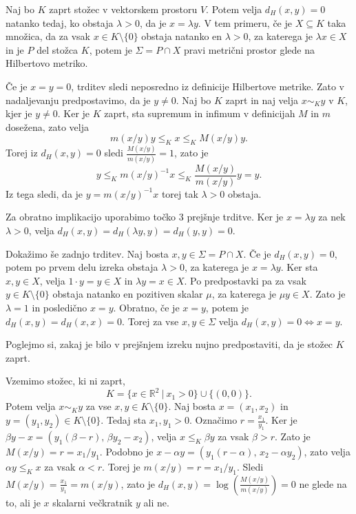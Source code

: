 \documentclass[mat2, tisk]{fmfdelo}
\begin{document}
\begin{izrek}\label{izr3.4}
  Naj bo $K$ zaprt stožec v vektorskem prostoru $V$. Potem velja $d_H(x,y)=0$
  natanko tedaj, ko obstaja $\lambda>0$, da je $x=\lambda y$.
  V tem primeru, če je $X\subseteq K$ taka množica, da za vsak
  $x\in K\setminus\{0\}$ obstaja natanko en $\lambda>0$, za katerega je
  $\lambda x\in X$ in je $P$ del stožca $K$, potem je $\Sigma=P\cap X$ 
  pravi metrični prostor glede na Hilbertovo metriko.
\end{izrek}
\begin{dokaz}
  Če je $x=y=0$, trditev sledi neposredno
  iz definicije Hilbertove metrike.
  Zato v nadaljevanju predpostavimo,
  da je $y\neq0$.
  Naj bo $K$ zaprt in naj velja $x\sim_K y$ v $K$, kjer je $y\neq0$. Ker je $K$ zaprt, sta supremum in infimum 
  v definicijah $M$ in $m$ dosežena, zato velja 
  \begin{equation}\label{eq:hilbert-ocena}
  m(x/y)y\le_K x\le_K M(x/y)y.
  \end{equation}
  Torej iz $d_H(x,y)=0$ sledi $\frac{M(x/y)}{m(x/y)}=1$, zato je
  \[
  y\le_K m(x/y)^{-1}x\le_K \frac{M(x/y)}{m(x/y)}y=y. 
  \]
  Iz tega sledi, da je $y = m(x/y)^{-1}x$ torej tak $\lambda>0$ obstaja. 
  
  Za obratno implikacijo uporabimo točko 3 prejšnje trditve.
  Ker je $x=\lambda y$ za nek $\lambda>0$, velja $d_H(x,y)=d_H(\lambda y,y)= d_H(y,y)=0$.

  Dokažimo še zadnjo trditev. Naj bosta $x,y\in\Sigma=P\cap X$. Če je $d_H(x,y)=0$, potem po prvem
  delu izreka obstaja $\lambda>0$, za katerega je $x=\lambda y$.
  Ker sta $x,y\in X$, velja $1\cdot y=y\in X$ in
  $\lambda y=x\in X$. Po predpostavki pa za vsak
  $y\in K\setminus\{0\}$ obstaja natanko en pozitiven skalar $\mu$,
  za katerega je $\mu y\in X$. Zato je $\lambda=1$ in posledično
  $x=y$.
  Obratno, če je $x=y$, potem je $d_H(x,y)=d_H(x,x)=0$.
  Torej za vse $x,y\in\Sigma$ velja $d_H(x,y)=0 \Longleftrightarrow x=y$.
\end{dokaz}

Poglejmo si, zakaj je bilo v prejšnjem izreku nujno predpostaviti, da je stožec $K$ zaprt. 
\begin{zgled}
  Vzemimo stožec, ki ni zaprt,
  \[
  K=\{x\in\mathbb{R}^2~|~x_1>0\}\cup\{(0,0)\}.
  \]
  Potem velja $x\sim_K y$ za vse $x,y\in K\setminus\{0\}$. 
  Naj bosta $x=(x_1,x_2)$ in $y=(y_1,y_2)\in K\setminus\{0\}$.
  Tedaj sta $x_1,y_1>0$. Označimo $r=\frac{x_1}{y_1}$.
  Ker je $\beta y-x=(y_1(\beta-r),\,\beta y_2-x_2)$, velja
  $x\le_K\beta y$ za vsak $\beta>r$. Zato je $M(x/y)=r=x_1/y_1$.
  Podobno je $x-\alpha y=(y_1(r-\alpha),\,x_2-\alpha y_2)$, zato velja
  $\alpha y\le_K x$ za vsak $\alpha<r$. Torej je $m(x/y)=r=x_1/y_1$.
  Sledi $M(x/y)=\frac{x_1}{y_1}=m(x/y)$, zato je
  $d_H(x,y)=\log\left(\frac{M(x/y)}{m(x/y)}\right)=0$ 
  ne glede na to, ali je $x$ skalarni večkratnik $y$ ali ne.
\end{zgled}
\end{document}
